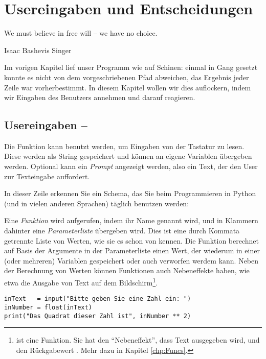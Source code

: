 \chapter{Usereingaben und Entscheidungen}
\epigraph{
	We must believe in free will -- we have no choice.
}{Isaac Bashevis Singer}

Im vorigen Kapitel lief unser Programm wie auf Schinen: einmal in Gang gesetzt konnte es nicht von dem vorgeschriebenen Pfad abweichen, das Ergebnis jeder Zeile war vorherbestimmt. In diesem Kapitel wollen wir dies auflockern, indem wir Eingaben des Benutzers annehmen und darauf reagieren.

\section{Usereingaben -- }
Die Funktion  kann benutzt werden, um Eingaben von der Tastatur zu lesen. Diese werden als String gespeichert und können an eigene Variablen übergeben werden. Optional kann ein \emph{Prompt} angezeigt werden, also ein Text, der den User zur Texteingabe auffordert.

\begin{codebox}
\end{codebox}

In dieser Zeile erkennen Sie ein Schema, das Sie beim Programmieren in Python (und in vielen anderen Sprachen) täglich benutzen werden:

Eine \emph{Funktion} wird aufgerufen, indem ihr Name genannt wird, und in Klammern dahinter eine \emph{Parameterliste} übergeben wird. Dies ist eine durch Kommata getrennte Liste von Werten, wie sie es schon von  kennen. Die Funktion berechnet auf Basis der Argumente in der Parameterliste einen Wert, der wiederum in einer (oder mehreren) Variablen gespeichert oder auch verworfen werdem kann. Neben der Berechnung von Werten können Funktionen auch Nebeneffekte haben, wie etwa die Ausgabe von Text auf dem Bildschirm\footnote{ ist eine Funktion. Sie hat den \enquote{Nebeneffekt}, dass Text ausgegeben wird, und den Rückgabewert . Mehr dazu in Kapitel \ref{chp:Funcs}.}.

\begin{codebox}
\begin{verbatim}
inText   = input("Bitte geben Sie eine Zahl ein: ")
inNumber = float(inText)
print("Das Quadrat dieser Zahl ist", inNumber ** 2)
\end{verbatim}
\end{codebox}

